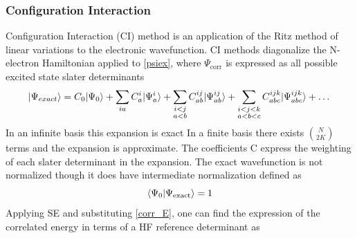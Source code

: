     \subsubsection{Configuration Interaction}
      Configuration Interaction (CI) method is an application of the Ritz method of linear variations to the electronic wavefunction\cite{Shavitt1977,SzaboAttila1982}. CI methods diagonalize the N-electron Hamiltonian applied to \cref{psiex}, where $\Psi_{\text{corr}}$ is expressed as all possible excited state slater determinants
        \begin{equation}\label{CI_wfn}
      	  | \Psi_{exact} \rangle = C_0| \Psi_0 \rangle + \sum_{ia} C^i_a | \Psi^i_a \rangle + \sum_{\substack{i<j\\  a<b}} C^{ij}_{ab} | \Psi^{ij}_{ab} \rangle + \sum_{\substack{i<j<k \\ a<b<c}} C_{abc}^{ijk} | \Psi_{abc}^{ijk} \rangle + \dots 
        \end{equation}
      In an infinite basis this expansion is exact
      In a finite basis there exists $\binom{N}{2K}$\cite{SzaboAttila1982} terms and the expansion is approximate. The coefficients C express the weighting of each slater determinant in the expansion. The exact wavefunction is not normalized though it does have intermediate normalization\cite{SzaboAttila1982} defined as 
        \begin{equation}
        \langle\Psi_0|\Psi_{\text{exact}}\rangle = 1
        \end{equation}
      Applying SE and substituting \cref{corr_E}, one can find the expression of the correlated energy in terms of a HF reference determinant as

